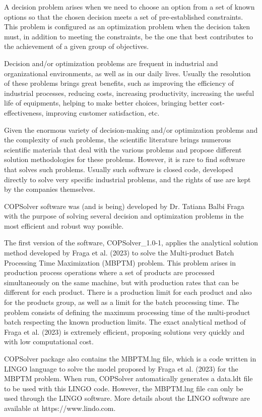 \documentclass[11pt, letterpaper]{article}
\begin{document}
A decision problem arises when we need to choose an option from a set of known options so that the chosen decision meets a set of pre-established constraints. This problem is configured as an optimization problem when the decision taken must, in addition to meeting the constraints, be the one that best contributes to the achievement of a given group of objectives.

Decision and/or optimization problems are frequent in industrial and organizational environments, as well as in our daily lives. Usually the resolution of these problems brings great benefits, such as improving the efficiency of industrial processes, reducing costs, increasing productivity, increasing the useful life of equipments, helping to make better choices, bringing better cost-effectiveness, improving customer satisfaction, etc.

Given the enormous variety of decision-making and/or optimization problems and the complexity of such problems, the scientific literature brings numerous scientific materials that deal with the various problems and propose different solution methodologies for these problems. However, it is rare to find software that solves such problems. Usually such software is closed code, developed directly to solve very specific industrial problems, and the rights of use are kept by the companies themselves. 

COPSolver software was (and is being) developed by Dr. Tatiana Balbi Fraga with the purpose of solving several decision and optimization problems in the most efficient and robust way possible.

The first version of the software, COPSolver\_1.0-1, applies the analytical solution method developed by Fraga et al. (2023) to solve the Multi-product Batch Processing Time Maximization (MBPTM) problem. This problem arises in production process operations where a set of products are processed simultaneously on the same machine, but with production rates that can be different for each product. There is a production limit for each product and also for the products group, as well as a limit for the batch processing time. The problem consists of defining the maximum processing time of the multi-product batch respecting the known production limits. The exact analytical method of Fraga et al. (2023) is extremely efficient, proposing solutions very quickly and with low computational cost. 

COPSolver package also contains the MBPTM.lng file, which is a code written in LINGO language to solve the model proposed by Fraga et al. (2023) for the MBPTM problem. When run, COPSolver automatically generates a data.ldt file to be used with this LINGO code. However, the MBPTM.lng file can only be used through the LINGO software. More details about the LINGO software are available at https://www.lindo.com.
\end{document}
